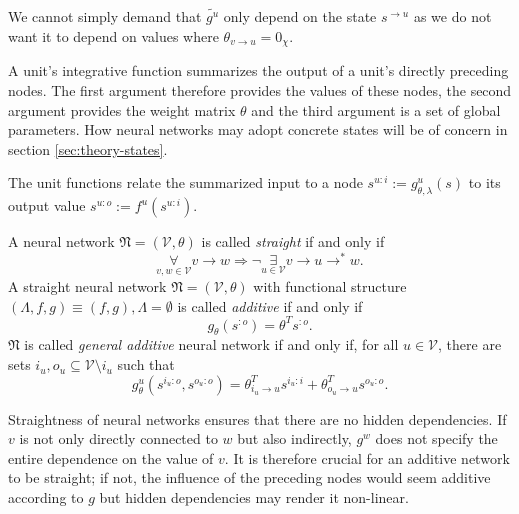 \documentclass[a4paper,11pt]{report}
\newcommand{\var}{\chi} %
\begin{document}
\begin{Rem}
We cannot simply demand that $\tilde{g^u}$ only depend on the state $s^{\to u}$ as we do not want it to depend on values where $\theta_{v\to u}=0_{\var}$.
\end{Rem}

\begin{Par}
A unit's integrative function summarizes the output of a unit's directly preceding nodes. The first argument therefore provides the values of these nodes, the second argument provides the weight matrix $\theta$ and the third argument is a set of global parameters. How neural networks may adopt concrete states will be of concern in section \ref{sec:theory-states}.
\end{Par}

\begin{Par}
The unit functions relate the summarized input to a node $s^{u:i}:=g^u_{\theta,\lambda}(s)$ to its output value $s^{u:o}:=f^u(s^{u:i})$.
\end{Par}

\begin{Def}
A neural network $\mathfrak{N}=(\mathcal{V},\theta)$ is called \emph{straight} if and only if
\[
\underset{v,w\in\mathcal{V}}{\forall}v\to w\Rightarrow\neg\underset{u\in\mathcal{V}}{\exists}v\to u\to^*w.
\]
A straight neural network $\mathfrak{N}=(\mathcal{V},\theta)$ with functional structure $(\Lambda,f,g)\equiv(f,g),\Lambda=\emptyset$ is called \emph{additive} if and only if
\begin{equation}
g_{\theta}(s^{:o})=\theta^Ts^{:o}.
\end{equation}
$\mathfrak{N}$ is called \emph{general additive} neural network if and only if, for all $u\in\mathcal{V}$, there are sets $i_u,o_u\subseteq \mathcal{V}\setminus i_u$ such that
\begin{equation}
g^u_{\theta}(s^{i_u:o},s^{o_u:o})=\theta_{i_u\to u}^Ts^{i_u:i}+\theta_{o_u\to u}^Ts^{o_u:o}.
\end{equation}
\end{Def}

\begin{Par}
Straightness of neural networks ensures that there are no hidden dependencies. If $v$ is not only directly connected to $w$ but also indirectly, $g^w$ does not specify the entire dependence on the value of $v$. It is therefore crucial for an additive network to be straight; if not, the influence of the preceding nodes would seem additive according to $g$ but hidden dependencies may render it non-linear.
\end{Par}
\end{document}

